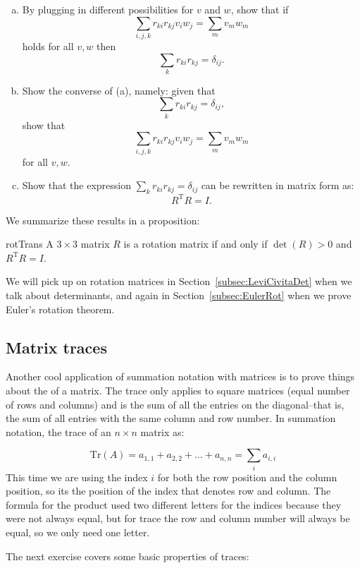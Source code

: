 \begin{exercise}{}
\begin{enumerate}[(a)]
\item
By plugging in different possibilities for $v$ and $w$, show that if
\[\sum_{i,j,k} r_{ki}r_{kj} v_i w_j =  \sum_m  v_m w_m \]
holds for all $v, w$ then 
\[\sum_{k} r_{ki}r_{kj}  = \delta_{ij}. \]
\item
Show the converse of (a), namely:  given that
\[\sum_{k} r_{ki}r_{kj}  = \delta_{ij}, \]
show that
\[\sum_{i,j,k} r_{ki}r_{kj} v_i w_j =  \sum_m  v_m w_m \]
for all $v, w$.
\item
Show that the expression $\sum_{k} r_{ki}r_{kj}  = \delta_{ij}$ can be rewritten in matrix form as:
\[R^{\text{T}}R = I.\]
\end{enumerate}
\end{exercise}
We summarize these results in a proposition:

\begin{prop}{rotTrans} A $3 \times 3$ matrix $R$ is a rotation matrix if and only if $\det(R)>0$ and $R^{\text{T}}R = I$.
\end{prop}
We will pick up on rotation matrices in Section~\ref{subsec:LeviCivitaDet} when we talk about determinants, and again in Section~\ref{subsec:EulerRot} when we prove Euler's rotation theorem.

\subsection{Matrix traces}
Another cool application of summation notation with matrices is to prove things about the  of a matrix.  The trace only applies to square matrices (equal number of rows and columns) and is the sum of all the entries on the diagonal--that is,  the sum of all entries with the same column and row number.  In summation notation, the trace of an $n \times n$ matrix as:

\[ \text{Tr} \left( A \right)= a_{1,1} + a_{2,2} + \ldots + a_{n,n} = \sum_{i} a_{i,i} \] 
This time we are using the index $i$ for both the row position and the column position, so its the position of the index that denotes row and column.  The formula for the product used two different letters for the indices because they were not always equal, but for trace the row and column number will always be equal, so we only need one letter.

The next exercise covers some basic properties of traces:


